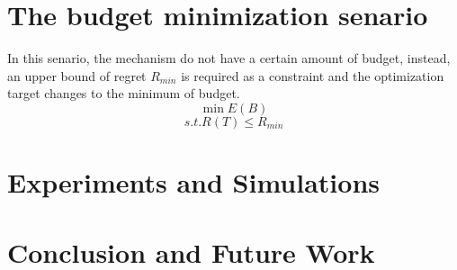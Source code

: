 \documentclass[10pt,conference,compsocconf,letterpaper]{IEEEtran}
\begin{document}
\section{The budget minimization senario}
In this senario, the mechanism do not have a certain amount of budget, instead, an upper bound of regret $R_{min}$ is required as a constraint and the optimization target changes to the minimum of budget.
\[\min E(B)\]
\[s.t. R(T)\leq R_{min}\]
\section{Experiments and Simulations}



\section{Conclusion and Future Work}\label{concandfuture}





%
\end{document}
